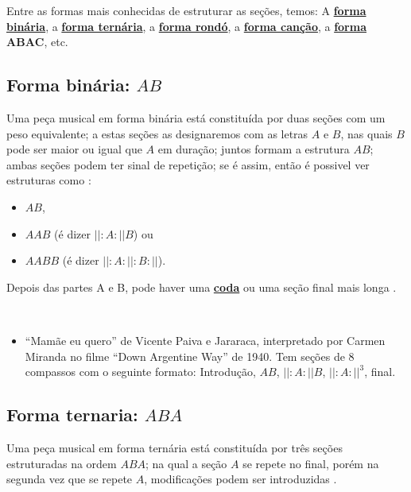 Entre as formas mais conhecidas de estruturar as seções, temos:
A \hyperref[subsec:formabinaria]{\textbf{forma binária}}, 
a \hyperref[subsec:formaternaria]{\textbf{forma ternária}}, 
a \hyperref[subsec:formarondo]{\textbf{forma rondó}}, 
a \hyperref[subsec:formacancao]{\textbf{forma canção}}, 
a \hyperref[subsec:formaabac]{\textbf{forma $\mathbf{ABAC}$}}, 
etc.
 



\subsection{Forma binária: $AB$}
\label{subsec:formabinaria}
Uma peça musical em forma binária está constituída por duas seções 
com um peso equivalente; 
a estas seções as designaremos com as letras $A$ e $B$, 
nas quais $B$ pode ser maior ou igual que $A$ em duração; juntos
formam a estrutura $AB$;
ambas seções podem ter sinal de repetição; se é assim, então é possivel ver estruturas como 
\cite[pp. 71]{bennett1993elementos} \cite[pp. 93]{copland1974ouvir}:
\begin{itemize}
\item $AB$,
\item $AAB$ (é dizer $||:A:||B$) ou 
\item $AABB$ (é dizer $||:A:||:B:||$).
\end{itemize}
Depois das partes A e B, 
pode haver uma \hyperref[ref:Coda]{\textbf{coda}} 
ou uma seção final mais longa \cite[pp. 86-87]{holland2013music}.

\begin{example} ~
\begin{itemize}
\item ``Mamãe eu quero'' de Vicente Paiva e Jararaca,
interpretado por Carmen Miranda no filme ``Down Argentine Way'' de 1940. 
Tem seções de 8 compassos 
com o seguinte formato:
Introdução, $AB$, $||:A:||B$, $||:A:||^3$, final.
\end{itemize}
\end{example}




\subsection{Forma ternaria: $ABA$}
\label{subsec:formaternaria}
Uma peça musical em forma ternária está constituída por três seções 
estruturadas na ordem $ABA$; 
na qual a seção $A$ se repete no final,
porém na segunda vez que se repete $A$,
modificações podem ser introduzidas \cite[pp. 71]{bennett1993elementos} \cite[pp. 88]{holland2013music}.


